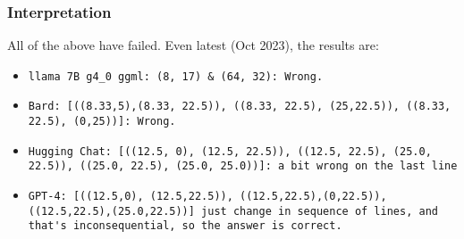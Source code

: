 \begin{frame}[fragile]\frametitle{Interpretation}

All of the above have failed. Even latest (Oct 2023), the results are:
\begin{itemize}
\item \lstinline|llama 7B g4_0 ggml: (8, 17) & (64, 32): Wrong.|
\item \lstinline|Bard: [((8.33,5),(8.33, 22.5)), ((8.33, 22.5), (25,22.5)), ((8.33, 22.5), (0,25))]: Wrong.|
\item \lstinline|Hugging Chat: [((12.5, 0), (12.5, 22.5)), ((12.5, 22.5), (25.0, 22.5)), ((25.0, 22.5), (25.0, 25.0))]: a bit wrong on the last line|
\item \lstinline|GPT-4: [((12.5,0), (12.5,22.5)), ((12.5,22.5),(0,22.5)), ((12.5,22.5),(25.0,22.5))] just change in sequence of lines, and that's inconsequential, so the answer is correct.|
\end{itemize}	
\end{frame}